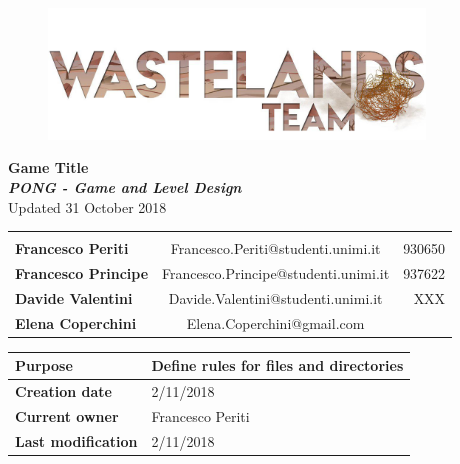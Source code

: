 \documentclass[12pt]{article}
\begin{document}
\begin{center}
  \begin{figure}
    \centering
  \vspace*{5\baselineskip}
  \includegraphics[width=10cm]{images/logoTeam}
  \end{figure}

  {\large \textbf{Game Title}} \\
  \textbf{\textit{PONG - Game and Level Design}} \\
  {\small Updated 31 October 2018} \\

\begin{tabular}{lcr}\\\\
\textbf{Francesco Periti}    & Francesco.Periti@studenti.unimi.it   & 930650\\
\textbf{Francesco Principe}  & Francesco.Principe@studenti.unimi.it & 937622\\
\textbf{Davide Valentini}    & Davide.Valentini@studenti.unimi.it   & XXX\\
\textbf{Elena Coperchini}   & Elena.Coperchini@gmail.com &\\
\end{tabular}


\begin{table}[]
  \begin{tabular}{|l|l||}
    \hline
    \cellcolor{gray}\textbf{Purpose} &  Define rules for files and directories \\\hline
    \cellcolor{gray}\textbf{Creation date} & 2/11/2018 \\\hline
    \cellcolor{gray}\textbf{Current owner} & Francesco Periti \\\hline
    \cellcolor{gray}\textbf{Last modification} & 2/11/2018\\   \hline
  \end{tabular}
\end{table}


\end{center}
\end{document}
